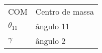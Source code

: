 \begin{longtable}{p{3cm}p{10cm}}
	COM						& Centro de massa \\
	

	$\theta_{11}$			& ângulo 11 \\	
	$\gamma$				& ângulo 2 \\


\end{longtable}

